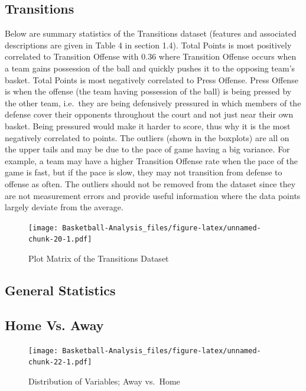 \documentclass[]{book}
\begin{document}
\hypertarget{transitions-1}{%
\subsection{Transitions}\label{transitions-1}}

Below are summary statistics of the Transitions dataset (features and associated descriptions are given in Table 4 in section 1.4). Total Points is most positively correlated to Transition Offense with 0.36 where Transition Offense occurs when a team gains possession of the ball and quickly pushes it to the opposing team's basket. Total Points is most negatively correlated to Press Offense. Press Offense is when the offense (the team having possession of the ball) is being pressed by the other team, i.e.~they are being defensively pressured in which members of the defense cover their opponents throughout the court and not just near their own basket. Being pressured would make it harder to score, thus why it is the most negatively correlated to points. The outliers (shown in the boxplots) are all on the upper tails and may be due to the pace of game having a big variance. For example, a team may have a higher Transition Offense rate when the pace of the game is fast, but if the pace is slow, they may not transition from defense to offense as often.
The outliers should not be removed from the dataset since they are not measurement errors and provide useful information where the data points largely deviate from the average.

\begin{figure}
\centering
\texttt{[image: Basketball-Analysis\_files/figure-latex/unnamed-chunk-20-1.pdf]}
\caption{\label{fig:unnamed-chunk-20}Plot Matrix of the Transitions Dataset}
\end{figure}

\hypertarget{general-statistics-1}{%
\subsection{General Statistics}\label{general-statistics-1}}

\hypertarget{home-vs.-away}{%
\subsection{Home Vs. Away}\label{home-vs.-away}}

\begin{figure}
\centering
\texttt{[image: Basketball-Analysis\_files/figure-latex/unnamed-chunk-22-1.pdf]}
\caption{\label{fig:unnamed-chunk-22}Distribution of Variables; Away vs.~Home}
\end{figure}
\end{document}
